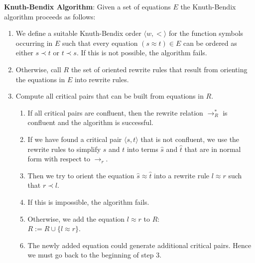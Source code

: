 \noindent
\textbf{Knuth-Bendix Algorithm}:  Given a set of equations $E$ the Knuth-Bendix algorithm proceeds as follows:
\begin{enumerate}
\item We define a suitable Knuth-Bendix order $\langle w, < \rangle$ for the function symbols occurring in $E$
      such that every equation  $(s \approx t) \in E$ can be ordered as either $s \prec t$ or $t \prec s$.
      If this is not possible, the algorithm fails.
\item Otherwise, call $R$ the set of oriented rewrite rules that result from orienting the equations in $E$
      into rewrite rules.
\item Compute all critical pairs that can be built from equations in $R$.
      \begin{enumerate}
      \item If all critical pairs are confluent, then the rewrite relation $\rightarrow^*_R$ is confluent
            and the algorithm is successful.
      \item If we have found a critical pair $\langle s, t \rangle$ that is not confluent, we use the rewrite
            rules to simplify $s$ and $t$ into terms $\widehat{s}$ and $\widehat{t}$ that are in normal form
            with respect to $\rightarrow_r$.
      \item Then we try to orient the equation $\widehat{s} \approx \widehat{t}$ into a rewrite rule
            $l \approx r$ such that $r \prec l$.
      \item If this is impossible, the algorithm fails.
      \item Otherwise, we add the equation $l \approx r$ to $R$:
            \\[0.2cm]
            \hspace*{1.3cm}
            $R := R \cup \{ l \approx r \}$.
      \item The newly added equation could generate additional critical pairs.
            Hence we must go back to the beginning of step 3. \eod
      \end{enumerate}
\end{enumerate}

